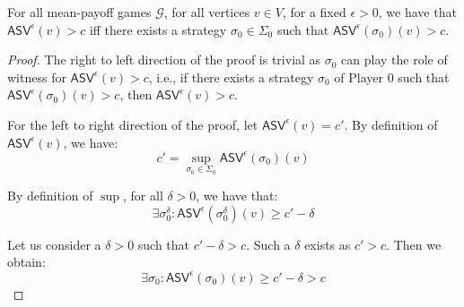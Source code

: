 \begin{lemma}
\label{lem:witness_strategy}
For all mean-payoff games $\mathcal{G}$, for all vertices $v \in V$, for a fixed $\epsilon > 0$, we have that $\mathsf{ASV}^{\epsilon}(v) > c$ iff there exists a strategy $\sigma_0 \in \Sigma_0$ such that $\mathsf{ASV}^{\epsilon}(\sigma_0)(v) > c$.
\end{lemma}
\begin{proof}

\noindent The right to left direction of the proof is trivial as $\sigma_0$ can play the role of witness for $\mathsf{ASV}^{\epsilon}(v) > c$, i.e., if there exists a strategy $\sigma_0$ of Player $0$ such that $\mathsf{ASV}^{\epsilon}(\sigma_0)(v) > c$, then $\mathsf{ASV}^{\epsilon}(v) > c$.

For the left to right direction of the proof, let $\mathsf{ASV}^{\epsilon}(v) = c'$. By definition of $\mathsf{ASV}^{\epsilon}( v)$, we have:
\begin{equation*}
    c' = \sup\limits_{\sigma_0 \in \Sigma_0}\mathsf{ASV}^{\epsilon}(\sigma_0)(v) 
\end{equation*}

\noindent By definition of $\sup$, for all $\delta > 0$, we have that:
\begin{equation*}
    \exists \sigma_0^{\delta}: \mathsf{ASV}^{\epsilon}(\sigma_0^{\delta})(v) \geqslant c' - \delta
\end{equation*}

\noindent Let us consider a $\delta > 0$ such that $c' - \delta > c$. Such a $\delta$ exists as $c' > c$. Then we obtain:
\begin{equation*}
    \exists \sigma_0: \mathsf{ASV}^{\epsilon}(\sigma_0)(v) \geqslant c' - \delta > c
\end{equation*}
\end{proof}